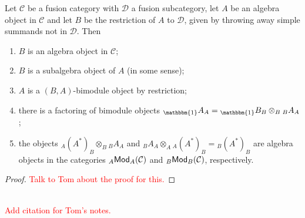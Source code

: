 \noindent\begin{theorem}\label{QuotientAlgebraObject} Let $\mathcal{C}$ be a fusion category with $\mathcal{D}$ a fusion subcategory, let $A$ be an algebra object in $\mathcal{C}$ and let $B$ be the restriction of $A$ to $\mathcal{D}$, given by throwing away simple summands not in $\mathcal{D}$. Then
\begin{enumerate}[label=\textup{(\roman*).}, ref=\textup{(\roman*)}, leftmargin=4\parindent]
\item $B$ is an algebra object in $\mathcal{C}$;
\item $B$ is a subalgebra object of $A$ (in some sense);
\item $A$ is a $(B, A)$-bimodule object by restriction;
\item there is a factoring of bimodule objects ${_\mathbbm{1}}A_A = {_\mathbbm{1}}B_B \otimes_B {_B}A_A$;
\item the objects ${_A}(A^*)_B \otimes_B {_B}A_A$ and ${_B}A_A \otimes_A {_A}(A^*)_B = {_B}(A^*)_B$ are algebra objects in the categories ${_A}\textup{\textsf{Mod}}_A(\mathcal{C})$ and ${_B}\textup{\textsf{Mod}}_B(\mathcal{C})$, respectively.\\
\end{enumerate}
\end{theorem}

\noindent\begin{proof} \textcolor{red}{Talk to Tom about the proof for this.}
\end{proof}\\

\noindent\textcolor{red}{Add citation for Tom's notes.}

\newpage

